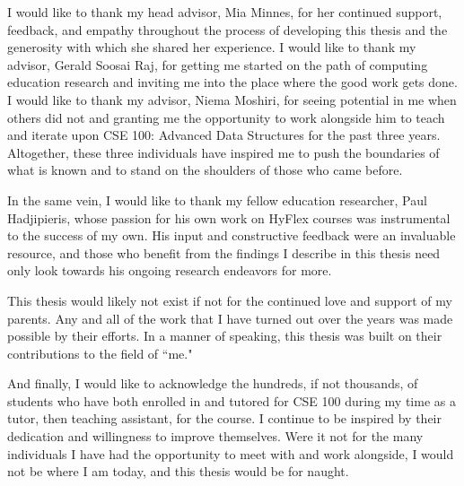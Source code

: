\begin{frontmatter}
%
%
\begin{acknowledgements}
  I would like to thank my head advisor, Mia Minnes, for her continued support, feedback, and empathy throughout the process of developing this thesis and the generosity with which she shared her experience. I would like to thank my advisor, Gerald Soosai Raj, for getting me started on the path of computing education research and inviting me into the place where the good work gets done. I would like to thank my advisor, Niema Moshiri, for seeing potential in me when others did not and granting me the opportunity to work alongside him to teach and iterate upon CSE 100: Advanced Data Structures for the past three years. Altogether, these three individuals have inspired me to push the boundaries of what is known and to stand on the shoulders of those who came before.

  In the same vein, I would like to thank my fellow education researcher, Paul Hadjipieris, whose passion for his own work on HyFlex courses was instrumental to the success of my own. His input and constructive feedback were an invaluable resource, and those who benefit from the findings I describe in this thesis need only look towards his ongoing research endeavors for more.

  This thesis would likely not exist if not for the continued love and support of my parents. Any and all of the work that I have turned out over the years was made possible by their efforts. In a manner of speaking, this thesis was built on their contributions to the field of ``me."

  And finally, I would like to acknowledge the hundreds, if not thousands, of students who have both enrolled in and tutored for CSE 100 during my time as a tutor, then teaching assistant, for the course. I continue to be inspired by their dedication and willingness to improve themselves. Were it not for the many individuals I have had the opportunity to meet with and work alongside, I would not be where I am today, and this thesis would be for naught.
\end{acknowledgements}



\end{frontmatter}
